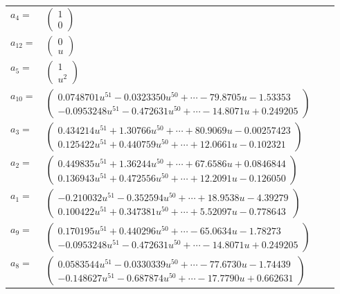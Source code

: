 \documentclass[1p]{elsarticle_modified}
\theoremstyle{definition}
\begin{document}
\begin{tabular}{m{7pt} m{180pt} m{7pt} m{180pt} }
\flushright $a_{4}=$&$\begin{pmatrix}1\\0\end{pmatrix}$ \\
\flushright $a_{12}=$&$\begin{pmatrix}0\\u\end{pmatrix}$ \\
\flushright $a_{5}=$&$\begin{pmatrix}1\\u^2\end{pmatrix}$ \\
\flushright $a_{10}=$&$\begin{pmatrix}0.0748701 u^{51}-0.0323350 u^{50}+\cdots-79.8705 u-1.53353\\-0.0953248 u^{51}-0.472631 u^{50}+\cdots-14.8071 u+0.249205\end{pmatrix}$ \\
\flushright $a_{3}=$&$\begin{pmatrix}0.434214 u^{51}+1.30766 u^{50}+\cdots+80.9069 u-0.00257423\\0.125422 u^{51}+0.440759 u^{50}+\cdots+12.0661 u-0.102321\end{pmatrix}$ \\
\flushright $a_{2}=$&$\begin{pmatrix}0.449835 u^{51}+1.36244 u^{50}+\cdots+67.6586 u+0.0846844\\0.136943 u^{51}+0.472556 u^{50}+\cdots+12.2091 u-0.126050\end{pmatrix}$ \\
\flushright $a_{1}=$&$\begin{pmatrix}-0.210032 u^{51}-0.352594 u^{50}+\cdots+18.9538 u-4.39279\\0.100422 u^{51}+0.347381 u^{50}+\cdots+5.52097 u-0.778643\end{pmatrix}$ \\
\flushright $a_{9}=$&$\begin{pmatrix}0.170195 u^{51}+0.440296 u^{50}+\cdots-65.0634 u-1.78273\\-0.0953248 u^{51}-0.472631 u^{50}+\cdots-14.8071 u+0.249205\end{pmatrix}$ \\
\flushright $a_{8}=$&$\begin{pmatrix}0.0583544 u^{51}-0.0330339 u^{50}+\cdots-77.6730 u-1.74439\\-0.148627 u^{51}-0.687874 u^{50}+\cdots-17.7790 u+0.662631\end{pmatrix}$ \\

\end{tabular}
\end{document}
